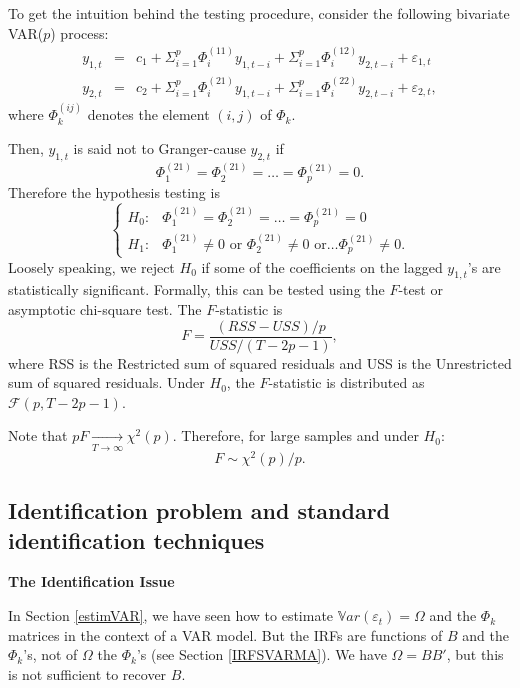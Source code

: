 \documentclass[
  12pt,
]{book}
\theoremstyle{definition}
\theoremstyle{definition}
\theoremstyle{definition}
\theoremstyle{definition}
\theoremstyle{remark}
\begin{document}
To get the intuition behind the testing procedure, consider the following
bivariate VAR(\(p\)) process:
\begin{eqnarray*}
y_{1,t} & = & c_1+\Sigma_{i=1}^{p}\Phi_i^{(11)}y_{1,t-i}+\Sigma_{i=1}^{p}\Phi_i^{(12)}y_{2,t-i}+\varepsilon_{1,t}\\
y_{2,t} & = & c_2+\Sigma_{i=1}^{p}\Phi_i^{(21)}y_{1,t-i}+\Sigma_{i=1}^{p}\Phi_i^{(22)}y_{2,t-i}+\varepsilon_{2,t},
\end{eqnarray*}
where \(\Phi_k^{(ij)}\) denotes the element \((i,j)\) of \(\Phi_k\).

Then, \(y_{1,t}\) is said not to Granger-cause \(y_{2,t}\) if
\[
\Phi_1^{(21)}=\Phi_2^{(21)}=\ldots=\Phi_p^{(21)}=0.
\]
Therefore the hypothesis testing is
\[
\begin{cases}
H_{0}: & \Phi_1^{(21)}=\Phi_2^{(21)}=\ldots=\Phi_p^{(21)}=0\\
H_{1}: & \Phi_1^{(21)}\neq0\mbox{ or }\Phi_2^{(21)}\neq0\mbox{ or}\ldots\Phi_p^{(21)}\neq0.\end{cases}
\]
Loosely speaking, we reject \(H_{0}\) if some of the coefficients on the lagged \(y_{1,t}\)'s are statistically significant. Formally, this can be tested using the \(F\)-test or asymptotic chi-square test. The \(F\)-statistic is
\[
F=\frac{(RSS-USS)/p}{USS/(T-2p-1)},
\]
where RSS is the Restricted sum of squared residuals and USS is the Unrestricted sum of squared residuals. Under \(H_{0}\), the \(F\)-statistic is distributed as \(\mathcal{F}(p,T-2p-1)\).

Note that \(pF\underset{T \rightarrow \infty}{\rightarrow}\chi^{2}(p)\). Therefore, for large samples and under \(H_0\):
\[
F \sim \chi^{2}(p)/p.
\]

\hypertarget{identification-problem-and-standard-identification-techniques}{%
\subsection{Identification problem and standard identification techniques}\label{identification-problem-and-standard-identification-techniques}}

\textbf{The Identification Issue}

In Section \ref{estimVAR}, we have seen how to estimate \(\mathbb{V}ar(\varepsilon_t) =\Omega\) and the \(\Phi_k\) matrices in the context of a VAR model. But the IRFs are functions of \(B\) and the \(\Phi_k\)'s, not of \(\Omega\) the \(\Phi_k\)'s (see Section \ref{IRFSVARMA}). We have \(\Omega = BB'\), but this is not sufficient to recover \(B\).
\end{document}
